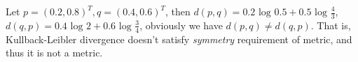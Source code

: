 \documentclass[a4paper,11pt]{article}
\theoremstyle{mytheor}
\begin{document}
Let $p = (0.2, 0.8)^T, q = (0.4, 0.6)^T$,
then $d(p,q) = 0.2 \text{ log }0.5 + 0.5\text{ log } \frac{4}{3}$, $d(q,p) = 0.4 \text{ log } 2 + 0.6 \text{ log }\frac{3}{4}$,
obviously we have $d(p,q) \neq d(q,p)$. That is, Kullback-Leibler divergence doesn't satisfy 
\textit{symmetry} requirement of metric, and thus it is not a metric.
\end{document}
